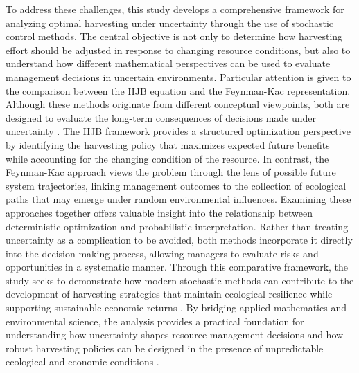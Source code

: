 \documentclass[11pt]{article}
\begin{document}
	To address these challenges, this study develops a comprehensive framework for analyzing optimal harvesting under uncertainty through the use of stochastic control methods. The central objective is not only to determine how harvesting effort should be adjusted in response to changing resource conditions, but also to understand how different mathematical perspectives can be used to evaluate management decisions in uncertain environments. Particular attention is given to the comparison between the HJB equation and the Feynman-Kac representation. Although these methods originate from different conceptual viewpoints, both are designed to evaluate the long-term consequences of decisions made under uncertainty \citep{kakkat2023cardiovascular,khan2023myb}. The HJB framework provides a structured optimization perspective by identifying the harvesting policy that maximizes expected future benefits while accounting for the changing condition of the resource. In contrast, the Feynman-Kac approach views the problem through the lens of possible future system trajectories, linking management outcomes to the collection of ecological paths that may emerge under random environmental influences. Examining these approaches together offers valuable insight into the relationship between deterministic optimization and probabilistic interpretation. Rather than treating uncertainty as a complication to be avoided, both methods incorporate it directly into the decision-making process, allowing managers to evaluate risks and opportunities in a systematic manner. Through this comparative framework, the study seeks to demonstrate how modern stochastic methods can contribute to the development of harvesting strategies that maintain ecological resilience while supporting sustainable economic returns \citep{kakkat2023cardiovascular,khan2024mp60}. By bridging applied mathematics and environmental science, the analysis provides a practical foundation for understanding how uncertainty shapes resource management decisions and how robust harvesting policies can be designed in the presence of unpredictable ecological and economic conditions \citep{maki2025new}.
	
\end{document}
